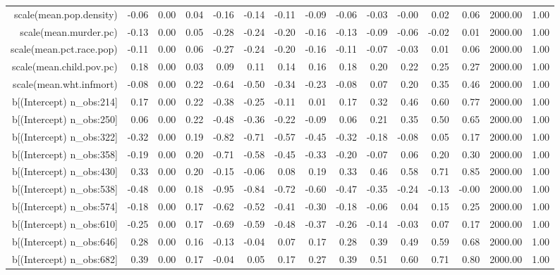 \begin{table}[ht]
\begin{tabular}{rrrrrrrrrrrrrrr}
  scale(mean.pop.density) & -0.06 & 0.00 & 0.04 & -0.16 & -0.14 & -0.11 & -0.09 & -0.06 & -0.03 & -0.00 & 0.02 & 0.06 & 2000.00 & 1.00 \\ 
  scale(mean.murder.pc) & -0.13 & 0.00 & 0.05 & -0.28 & -0.24 & -0.20 & -0.16 & -0.13 & -0.09 & -0.06 & -0.02 & 0.01 & 2000.00 & 1.00 \\ 
  scale(mean.pct.race.pop) & -0.11 & 0.00 & 0.06 & -0.27 & -0.24 & -0.20 & -0.16 & -0.11 & -0.07 & -0.03 & 0.01 & 0.06 & 2000.00 & 1.00 \\ 
  scale(mean.child.pov.pc) & 0.18 & 0.00 & 0.03 & 0.09 & 0.11 & 0.14 & 0.16 & 0.18 & 0.20 & 0.22 & 0.25 & 0.27 & 2000.00 & 1.00 \\ 
  scale(mean.wht.infmort) & -0.08 & 0.00 & 0.22 & -0.64 & -0.50 & -0.34 & -0.23 & -0.08 & 0.07 & 0.20 & 0.35 & 0.46 & 2000.00 & 1.00 \\ 
  b[(Intercept) n\_obs:214] & 0.17 & 0.00 & 0.22 & -0.38 & -0.25 & -0.11 & 0.01 & 0.17 & 0.32 & 0.46 & 0.60 & 0.77 & 2000.00 & 1.00 \\ 
  b[(Intercept) n\_obs:250] & 0.06 & 0.00 & 0.22 & -0.48 & -0.36 & -0.22 & -0.09 & 0.06 & 0.21 & 0.35 & 0.50 & 0.65 & 2000.00 & 1.00 \\ 
  b[(Intercept) n\_obs:322] & -0.32 & 0.00 & 0.19 & -0.82 & -0.71 & -0.57 & -0.45 & -0.32 & -0.18 & -0.08 & 0.05 & 0.17 & 2000.00 & 1.00 \\ 
  b[(Intercept) n\_obs:358] & -0.19 & 0.00 & 0.20 & -0.71 & -0.58 & -0.45 & -0.33 & -0.20 & -0.07 & 0.06 & 0.20 & 0.30 & 2000.00 & 1.00 \\ 
  b[(Intercept) n\_obs:430] & 0.33 & 0.00 & 0.20 & -0.15 & -0.06 & 0.08 & 0.19 & 0.33 & 0.46 & 0.58 & 0.71 & 0.85 & 2000.00 & 1.00 \\ 
  b[(Intercept) n\_obs:538] & -0.48 & 0.00 & 0.18 & -0.95 & -0.84 & -0.72 & -0.60 & -0.47 & -0.35 & -0.24 & -0.13 & -0.00 & 2000.00 & 1.00 \\ 
  b[(Intercept) n\_obs:574] & -0.18 & 0.00 & 0.17 & -0.62 & -0.52 & -0.41 & -0.30 & -0.18 & -0.06 & 0.04 & 0.15 & 0.25 & 2000.00 & 1.00 \\ 
  b[(Intercept) n\_obs:610] & -0.25 & 0.00 & 0.17 & -0.69 & -0.59 & -0.48 & -0.37 & -0.26 & -0.14 & -0.03 & 0.07 & 0.17 & 2000.00 & 1.00 \\ 
  b[(Intercept) n\_obs:646] & 0.28 & 0.00 & 0.16 & -0.13 & -0.04 & 0.07 & 0.17 & 0.28 & 0.39 & 0.49 & 0.59 & 0.68 & 2000.00 & 1.00 \\ 
  b[(Intercept) n\_obs:682] & 0.39 & 0.00 & 0.17 & -0.04 & 0.05 & 0.17 & 0.27 & 0.39 & 0.51 & 0.60 & 0.71 & 0.80 & 2000.00 & 1.00 \\ 

\end{tabular}
\end{table}
